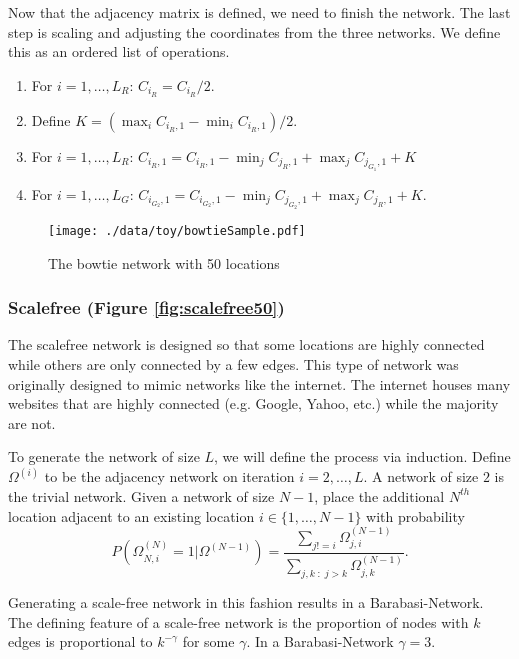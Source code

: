 \documentclass[11pt]{article}
\begin{document}
Now that the adjacency matrix is defined, we need to finish the
network.  The last step is scaling and adjusting the coordinates from
the three networks.  We define this as an ordered list of operations.
\begin{enumerate}
  \item For $i=1,\ldots,L_R$: $C_{i_{R}} = C_{i_{R}}/2$.
  \item Define $K = (\max_i C_{i_{R},1} - \min_i C_{i_{R},1})/2$.
  \item For $i=1,\ldots,L_R$: $C_{i_{R},1} = C_{i_{R},1} -
  \min_j C_{j_{R},1} + \max_j C_{j_{G_1},1} + K$
  \item For $i=1,\ldots,L_G$:
  $C_{i_{G_2},1} = C_{i_{G_2},1} - \min_j C_{j_{G_2},1} + \max_j
  C_{j_{R},1} + K$.
\end{enumerate}


\begin{figure}[htb]
\centering
\texttt{[image: ./data/toy/bowtieSample.pdf]}
\caption{\label{fig:bowtie50}The bowtie network with 50 locations}
\end{figure}


\subsubsection{Scalefree (Figure \ref{fig:scalefree50})}
\label{sec-3-1-6}

The scalefree network is designed so that some locations are
highly connected while others are only connected by a few edges.
This type of network was originally designed to mimic networks
like the internet.  The internet houses many websites that are
highly connected (e.g. Google, Yahoo, etc.) while the majority are
not.

To generate the network of size $L$, we will define the process via
induction.  Define $\Omega^{(i)}$ to be the adjacency network on
iteration $i = 2,\ldots,L$.  A network of size $2$ is the trivial
network.  Given a network of size $N-1$, place the additional $N^{th}$
location adjacent to an existing location $i \in \lbrace
    1,\ldots,N-1\rbrace$ with probability
\begin{equation*}
  P(\Omega^{(N)}_{N,i} = 1 | \Omega^{(N-1)}) = 
  \frac{\sum_{j!=i} \Omega^{(N-1)}_{j,i}}{\sum_{j,k \;:\; j > k} \Omega^{(N-1)}_{j,k}}.
\end{equation*}

Generating a scale-free network in this fashion results in a
Barabasi-Network.  The defining feature of a scale-free network is the
proportion of nodes with $k$ edges is proportional to $k^{-\gamma}$
for some $\gamma$.  In a Barabasi-Network $\gamma = 3$.
\end{document}
